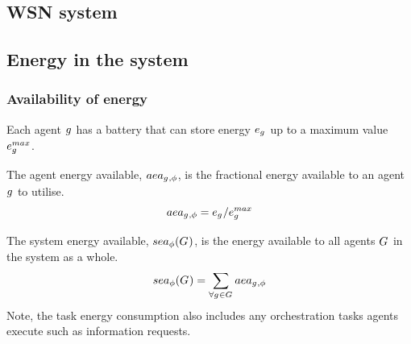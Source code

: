 \newcommand{\varEnergy}[2]{\varSymbol{e}{\varAgent{}{}}{#2}}
\newcommand{\setEnergy}[2]{\setSymbol{E}{#1}{#2}}
\newcommand{\varEnergyMax}[2]{\varEnergy{\varAgent{}{}}{max}}
\newcommand{\setEnergyDeltaMeasurement}[2]{\Delta\setSymbol{E}{\texttt{measure}}{#2}}
\newcommand{\setEnergyDataAcquisition}[2]{\setSymbol{E}{\texttt{DAQ}}{#2}}
\newcommand{\setEnergyDeltaAggregate}[2]{\Delta\setSymbol{E}{\texttt{aggregate}}{#2}}
\newcommand{\setEnergyBroadcast}[2]{\setSymbol{E}{\texttt{BX}}{#2}}
\newcommand{\setEnergyCompute}[2]{\setSymbol{E}{\texttt{compute}}{#2}}
\newcommand{\setEnergyTransmission}[2]{\setSymbol{E}{\texttt{TX}}{#2}}
\newcommand{\setEnergyReceived}[2]{\setSymbol{E}{\texttt{RX}}{#2}}
\subsection{WSN system}

\subsection{Energy in the system}

\subsubsection{Availability of energy}

Each agent $g_{}^{}$ has a battery that can store energy $\varEnergy{}{}$ up to a maximum value $\varEnergyMax{}{}$.

\begin{definition}
	The agent energy available, $aea_{g_{}^{},\phi}$, is the fractional energy available to an agent $g_{}^{}$ to utilise.
	\begin{equation}
		\varAgentEnergyAvailable{}{} = \varEnergy{}{} / \varEnergyMax{}{}
	\end{equation}
\end{definition}

\begin{definition}
	The system energy available, $\functionSystemEnergyAvailable{}{}$, is the energy available to all agents $G_{}^{}$ in the system as a whole.
	\begin{equation}
		\functionSystemEnergyAvailable{}{} 
		= \sum_{\forall \varAgent{}{} \in \setAgents{}{}} \varAgentEnergyAvailable{\varAgent{i}{}}{}
	\end{equation}
	Note, the task energy consumption also includes any orchestration tasks agents execute such as information requests.
\end{definition}

